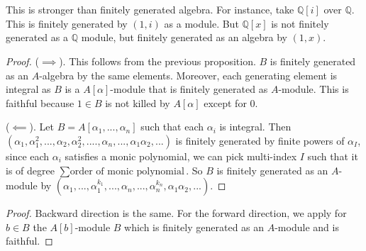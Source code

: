 \section{}
\begin{remark}
    This is stronger than finitely generated algebra. For instance, take $\mathbb{Q}[i]$ over $\mathbb{Q}$. This is finitely generated by $(1,i)$ as a module. 
    But $\mathbb{Q}[x]$ is not finitely generated as a $\mathbb{Q}$ module, but finitely generated as an algebra by $(1,x)$.
\end{remark}

\begin{proof}
    
    ($\implies$). This follows from the previous proposition. $B$ is finitely generated as an $A$-algebra by the same elements. Moreover, each generating element is integral as $B$ is a $A[\alpha]$-module that is finitely generated as $A$-module. This is faithful because $1\in B$ is not killed by $A[\alpha]$ except for $0$.

    ($\impliedby$). Let $B=A[\alpha_1,...,\alpha_n]$ such that each $\alpha_i$ is integral. Then $(\alpha_1,\alpha_1^2,...,\alpha_2,\alpha_2^2,....,\alpha_n,..., \alpha_1\alpha_2,...)$ is finitely generated by finite powers of $\alpha_I$, since each $\alpha_i$ satisfies a monic polynomial, we can pick multi-index $I$ such that it is of degree $\sum \textrm{order of monic polynomial}$. So $B$ is finitely generated as an $A$-module by $(\alpha_1,...,\alpha_1^{k_1},...,\alpha_n,...,\alpha_n^{k_n}, \alpha_1\alpha_2,...)$. 


\end{proof}
\begin{proof}
    Backward direction is the same. For the forward direction, we apply for $b\in B$ the $A[b]$-module $B$ which is finitely generated as an $A$-module and is faithful.
\end{proof}

